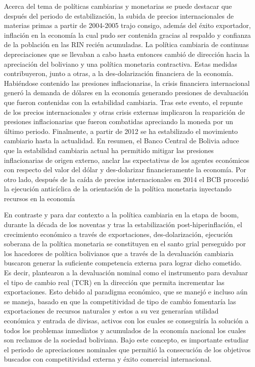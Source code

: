 \documentclass[12pt,letterpaper]{article}
\begin{document}
Acerca del tema de políticas cambiarias y monetarias se puede destacar que después del periodo de estabilización, la subida de precios internacionales de materias primas a partir de 2004-2005 trajo consigo, además del éxito exportador, inflación en la economía la cual pudo ser contenida gracias al respaldo y confianza de la población en las RIN recién acumuladas. La política cambiaria de continuas depreciaciones que se llevaban a cabo hasta entonces cambió de dirección hacia la apreciación del boliviano y una política monetaria contractiva. Estas medidas contribuyeron, junto a otras, a la des-dolarización financiera de la economía. Habiéndose contenido las presiones inflacionarias, la crisis financiera internacional generó la demanda de dólares en la economía generando presiones de devaluación que fueron contenidas con la estabilidad cambiaria. Tras este evento, el repunte de los precios internacionales y otras crisis externas implicaron la reaparición de presiones inflacionarias que fueron combatidas apreciando la moneda por un último periodo. Finalmente, a partir de 2012 se ha estabilizado el movimiento cambiario hasta la actualidad. En resumen, el Banco Central de Bolivia aduce que la estabilidad cambiaria actual ha permitido mitigar las presiones inflacionarias de origen externo, anclar las expectativas de los agentes económicos con respecto del valor del dólar y des-dolarizar financieramente la economía. Por otro lado, después de la caída de precios internacionales en 2014 el BCB procedió la ejecución anticíclica de la orientación de la política monetaria inyectando recursos en la economía

En contraste y para dar contexto a la política cambiaria en la etapa de boom, durante la década de los noventas y tras la estabilización post-hiperinflación, el crecimiento económico a través de exportaciones, des-dolarización, ejecución soberana de la política monetaria se constituyen en el santo grial perseguido por los hacedores de política bolivianos que a través de la devaluación cambiaria buscaron generar la suficiente competencia externa para lograr dicho cometido. Es decir, plantearon a la devaluación nominal como el instrumento para devaluar el tipo de cambio real (TCR) en la dirección que permita incrementar las exportaciones. Esto debido al paradigma económico, que se manejó e incluso aún se maneja, basado en que la competitividad de tipo de cambio fomentaría las exportaciones de recursos naturales y estos a su vez generarían utilidad económica y entrada de divisas, activos con los cuales se conseguiría la solución a todos los problemas inmediatos y acumulados de la economía nacional los cuales son reclamos de la sociedad boliviana. Bajo este concepto, es importante estudiar el periodo de apreciaciones nominales que permitió la consecución de los objetivos buscados con competitividad externa y éxito comercial internacional.
\end{document}
